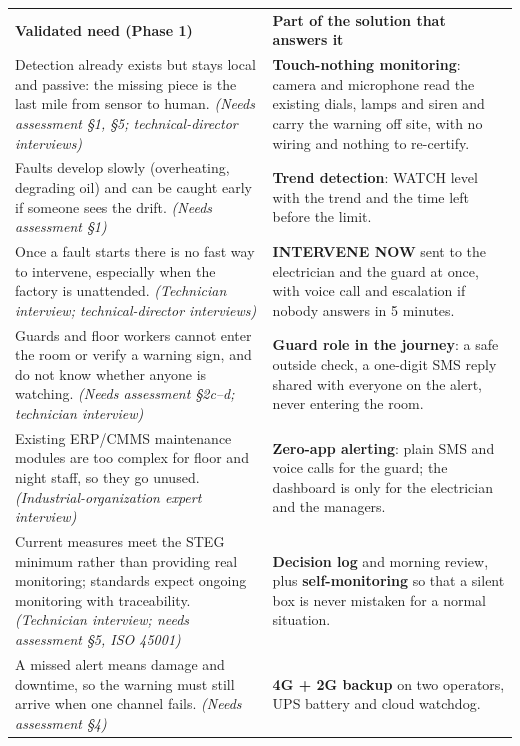 \documentclass[10pt]{article}
\begin{document}
\vspace{2pt}
\noindent\begin{tabularx}{\linewidth}{Y Y}
\textbf{Validated need (Phase 1)} & \textbf{Part of the solution that answers it} \\
Detection already exists but stays local and passive: the missing piece is the last mile from sensor to human. \emph{(Needs assessment §1, §5; technical-director interviews)} &
\textbf{Touch-nothing monitoring}: camera and microphone read the existing dials, lamps and siren and carry the warning off site, with no wiring and nothing to re-certify. \\
Faults develop slowly (overheating, degrading oil) and can be caught early if someone sees the drift. \emph{(Needs assessment §1)} &
\textbf{Trend detection}: WATCH level with the trend and the time left before the limit. \\
Once a fault starts there is no fast way to intervene, especially when the factory is unattended. \emph{(Technician interview; technical-director interviews)} &
\textbf{INTERVENE NOW} sent to the electrician and the guard at once, with voice call and escalation if nobody answers in 5 minutes. \\
Guards and floor workers cannot enter the room or verify a warning sign, and do not know whether anyone is watching. \emph{(Needs assessment §2c--d; technician interview)} &
\textbf{Guard role in the journey}: a safe outside check, a one-digit SMS reply shared with everyone on the alert, never entering the room. \\
Existing ERP/CMMS maintenance modules are too complex for floor and night staff, so they go unused. \emph{(Industrial-organization expert interview)} &
\textbf{Zero-app alerting}: plain SMS and voice calls for the guard; the dashboard is only for the electrician and the managers. \\
Current measures meet the STEG minimum rather than providing real monitoring; standards expect ongoing monitoring with traceability. \emph{(Technician interview; needs assessment §5, ISO 45001)} &
\textbf{Decision log} and morning review, plus \textbf{self-monitoring} so that a silent box is never mistaken for a normal situation. \\
A missed alert means damage and downtime, so the warning must still arrive when one channel fails. \emph{(Needs assessment §4)} &
\textbf{4G + 2G backup} on two operators, UPS battery and cloud watchdog. \\
\end{tabularx}
\end{document}
